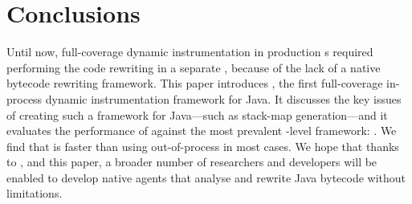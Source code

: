 \section{Conclusions}
\label{sec:jnif-conclusions}

Until now,
full-coverage dynamic instrumentation in production \jvm{}s required performing the code rewriting in a separate \jvm{}, 
because of the lack of a native bytecode rewriting framework.
This paper introduces \jnif{}, the first full-coverage in-process dynamic instrumentation framework for Java.
It discusses the key issues of creating such a framework for Java---such as stack-map generation---and
it evaluates the performance of \jnif{} against the most prevalent \java{}-level framework: \asm{}.
We find that \jnif{} is faster than using out-of-process \asm{} in most cases.
We hope that thanks to \jnif{}, and this paper, a broader number of researchers and developers will
be enabled to develop native \jvm{} agents that analyse and rewrite Java bytecode without limitations.
